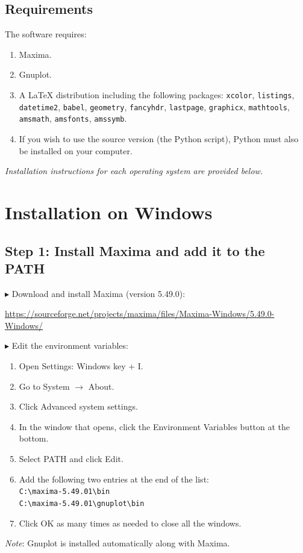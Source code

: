 \documentclass[a4paper,11pt]{article}
\newcounter{num}
\begin{document}
\subsection*{Requirements}
The software requires:
\begin{enumerate}
\item Maxima.
\item Gnuplot.
\item A \LaTeX{} distribution including the following packages: \texttt{xcolor}, \texttt{listings}, \texttt{datetime2}, \texttt{babel}, \texttt{geometry}, \texttt{fancyhdr}, \texttt{lastpage}, \texttt{graphicx}, \texttt{mathtools}, \texttt{amsmath}, \texttt{amsfonts}, \texttt{amssymb}.
\item If you wish to use the source version (the Python script), Python must also be installed on your computer.
\end{enumerate}
\emph{Installation instructions for each operating system are provided below.}

\section*{Installation on Windows}
\subsection*{Step 1: Install Maxima and add it to the PATH}
$\blacktriangleright$ Download and install Maxima (version 5.49.0):
\begin{center}
\url{https://sourceforge.net/projects/maxima/files/Maxima-Windows/5.49.0-Windows/}
\end{center}
$\blacktriangleright$ Edit the environment variables:
\begin{enumerate}
\item Open Settings: Windows key + I.
\item Go to System $\rightarrow$ About.
\item Click Advanced system settings.
\item In the window that opens, click the Environment Variables button at the bottom.
\item Select PATH and click Edit.
\item Add the following two entries at the end of the list:\\
\verb|C:\maxima-5.49.01\bin|\\
\verb|C:\maxima-5.49.01\gnuplot\bin|
\item Click OK as many times as needed to close all the windows.
\end{enumerate}
\textit{Note}: Gnuplot is installed automatically along with Maxima.
\end{document}
